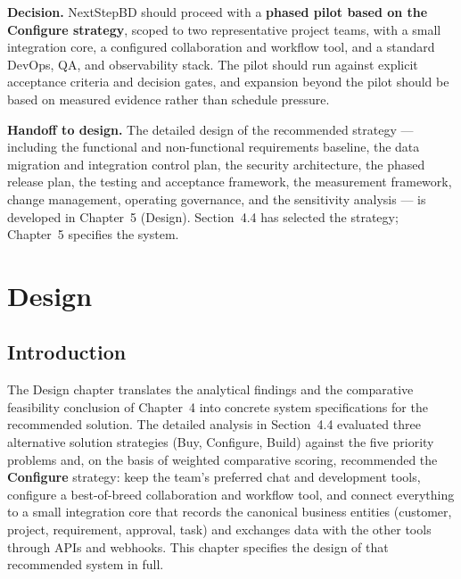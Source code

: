 \documentclass[12pt,a4paper]{report}
\begin{document}
\textbf{Decision.} NextStepBD should proceed with a \textbf{phased pilot based on the
Configure strategy}, scoped to two representative project teams, with a small integration
core, a configured collaboration and workflow tool, and a standard DevOps, QA, and
observability stack. The pilot should run against explicit acceptance criteria and decision
gates, and expansion beyond the pilot should be based on measured evidence rather than
schedule pressure.

\textbf{Handoff to design.} The detailed design of the recommended strategy --- including
the functional and non-functional requirements baseline, the data migration and integration
control plan, the security architecture, the phased release plan, the testing and
acceptance framework, the measurement framework, change management, operating governance, and
the sensitivity analysis --- is developed in Chapter~5 (Design). Section~4.4 has selected
the strategy; Chapter~5 specifies the system.




\chapter{Design}

\section{Introduction}
\label{sec:design-introduction}

The Design chapter translates the analytical findings and the comparative feasibility
conclusion of Chapter~4 into concrete system specifications for the recommended solution.
The detailed analysis in Section~4.4 evaluated three alternative solution strategies
(Buy, Configure, Build) against the five priority problems and, on the basis of weighted
comparative scoring, recommended the \textbf{Configure} strategy: keep the team's
preferred chat and development tools, configure a best-of-breed collaboration and workflow
tool, and connect everything to a small integration core that records the canonical
business entities (customer, project, requirement, approval, task) and exchanges data
with the other tools through APIs and webhooks. This chapter specifies the design of
that recommended system in full.
\end{document}
